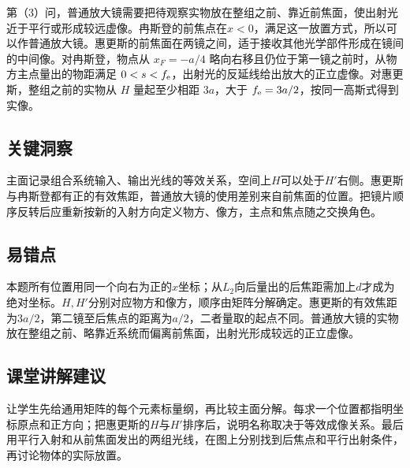 \documentclass[UTF8,fontset=fandol,a4paper,11pt]{ctexart}
\begin{document}
第（3）问，普通放大镜需要把待观察实物放在整组之前、靠近前焦面，使出射光近于平行或形成较远虚像。冉斯登的前焦点在$x<0$，满足这一放置方式，所以可以作普通放大镜。惠更斯的前焦面在两镜之间，适于接收其他光学部件形成在镜间的中间像。对冉斯登，物点从 $x_F=-a/4$ 略向右移且仍位于第一镜之前时，从物方主点量出的物距满足 $0<s<f_{\rm e}$，出射光的反延线给出放大的正立虚像。对惠更斯，整组之前的实物从 $H$ 量起至少相距 $3a$，大于 $f_{\rm e}=3a/2$，按同一高斯式得到实像。




\subsection*{关键洞察}

主面记录组合系统输入、输出光线的等效关系，空间上$H$可以处于$H'$右侧。惠更斯与冉斯登都有正的有效焦距，普通放大镜的使用差别来自前焦面的位置。把镜片顺序反转后应重新按新的入射方向定义物方、像方，主点和焦点随之交换角色。



\subsection*{易错点}

本题所有位置用同一个向右为正的$x$坐标；从$L_2$向后量出的后焦距需加上$d$才成为绝对坐标。$H,H'$分别对应物方和像方，顺序由矩阵分解确定。惠更斯的有效焦距为$3a/2$，第二镜至后焦点的距离为$a/2$，二者量取的起点不同。普通放大镜的实物放在整组之前、略靠近系统而偏离前焦面，出射光形成较远的正立虚像。



\subsection*{课堂讲解建议}

让学生先给通用矩阵的每个元素标量纲，再比较主面分解。每求一个位置都指明坐标原点和正方向；把惠更斯的$H$与$H'$排序后，说明名称取决于等效成像关系。最后用平行入射和从前焦面发出的两组光线，在图上分别找到后焦点和平行出射条件，再讨论物体的实际放置。


\end{document}
